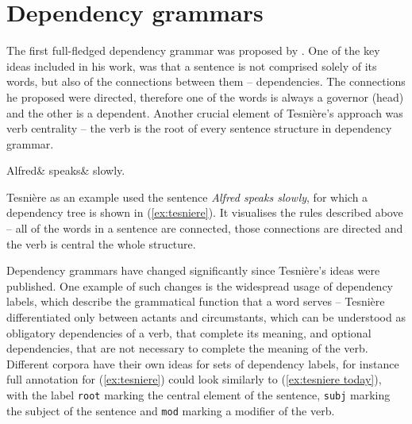\section{Dependency grammars}
The first full-fledged dependency grammar was proposed by \cite{tesniere-orig, tesniere}. One of the key ideas included in his work, was that a sentence is not comprised solely of its words, but also of the connections between them -- dependencies. The connections he proposed were directed, therefore one of the words is always a governor (head) and the other is a dependent. Another crucial element of Tesnière's approach was verb centrality -- the verb is the root of every sentence structure in dependency grammar. 

\begin{center}
\begin{exe}
	\ex
	\label{ex:tesniere}
    \begin{dependency}[theme = simple, baseline=-\the\dimexpr\fontdimen22\textfont2\relax]
    \begin{deptext}
        Alfred\& speaks\& slowly.\\
    \end{deptext}
    \end{dependency}
\end{exe}
\end{center}

Tesnière as an example used the sentence \textsl{Alfred speaks slowly}, for which a dependency tree is shown in (\ref{ex:tesniere}). It visualises the rules described above -- all of the words in a sentence are connected, those connections are directed and the verb is central the whole structure. 

Dependency grammars have changed significantly since Tesnière's ideas were published. One example of such changes is the widespread usage of dependency labels, which describe the grammatical function that a word serves -- Tesnière differentiated only between actants and circumstants, which can be understood as obligatory dependencies of a verb, that complete its meaning, and optional dependencies, that are not necessary to complete the meaning of the verb. Different corpora have their own ideas for sets of dependency labels, for instance full annotation for (\ref{ex:tesniere}) could look similarly to (\ref{ex:tesniere today}), with the label \texttt{root} marking the central element of the sentence, \texttt{subj} marking the subject of the sentence and \texttt{mod} marking a modifier of the verb.

